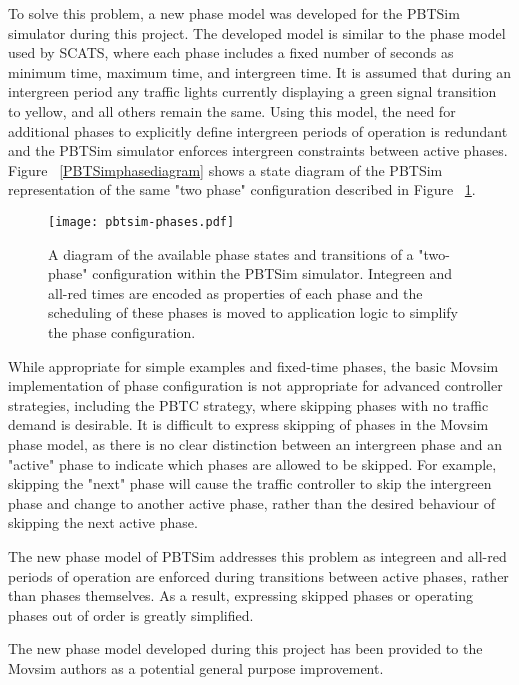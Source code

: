 To solve this problem, a new phase model was developed for the PBTSim simulator during this project. The developed model is similar to the phase model used by SCATS, where each phase includes a fixed number of seconds as minimum time, maximum time, and intergreen time. It is assumed that during an intergreen period any traffic lights currently displaying a green signal transition to yellow, and all others remain the same. Using this model, the need for additional phases to explicitly define intergreen periods of operation is redundant and the PBTSim simulator enforces intergreen constraints between active phases. Figure ~\ref{PBTSimphasediagram} shows a state diagram of the PBTSim representation of the same "two phase" configuration described in Figure ~\ref{movsimphasediagram}.

\begin{figure}[]
\centering
	\texttt{[image: pbtsim-phases.pdf]}
	\caption{ A diagram of the available phase states and transitions of a "two-phase" configuration within the PBTSim simulator. Integreen and all-red times are encoded as properties of each phase and the scheduling of these phases is moved to application logic to simplify the phase configuration. }
\label{movsimphasediagram}
\end{figure}

While appropriate for simple examples and fixed-time phases, the basic Movsim implementation of phase configuration is not appropriate for advanced controller strategies, including the PBTC strategy, where skipping phases with no traffic demand is desirable. It is difficult to express skipping of phases in the Movsim phase model, as there is no clear distinction between an intergreen phase and an "active" phase to indicate which phases are allowed to be skipped. For example, skipping the "next" phase will cause the traffic controller to skip the intergreen phase and change to another active phase, rather than the desired behaviour of skipping the next active phase.

The new phase model of PBTSim addresses this problem as integreen and all-red periods of operation are enforced during transitions between active phases, rather than phases themselves. As a result, expressing skipped phases or operating phases out of order is greatly simplified. 

The new phase model developed during this project has been provided to the Movsim authors as a potential general purpose improvement.


